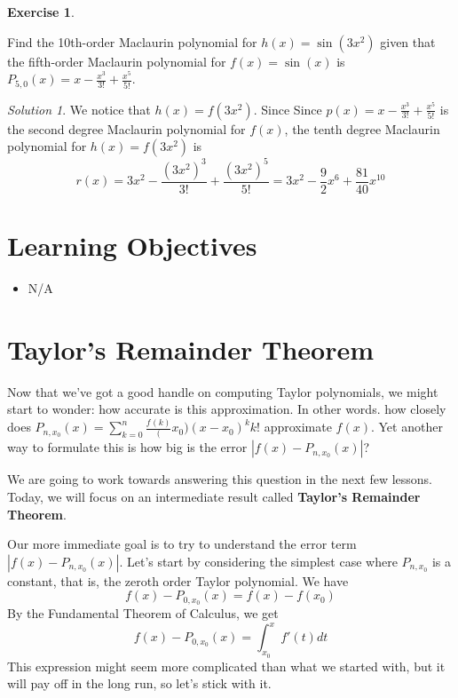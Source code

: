 \documentclass[
]{book}
\providecommand{\tightlist}{%
  \setlength{\itemsep}{0pt}\setlength{\parskip}{0pt}}
\theoremstyle{definition}
\theoremstyle{definition}
\theoremstyle{definition}
\newtheorem{exercise}{Exercise}[chapter]
\theoremstyle{definition}
\theoremstyle{remark}
\newtheorem*{solution}{Solution}
\begin{document}
\begin{exercise}
\protect\hypertarget{exr:unlabeled-div-159}{}\label{exr:unlabeled-div-159}

Find the 10th-order Maclaurin polynomial for \(h(x)=\sin(3x^2)\) given that the fifth-order Maclaurin polynomial for \(f(x)=\sin(x)\) is \(P_{5,0}(x)=x-\frac{x^3}{3!}+\frac{x^5}{5!}\).

\end{exercise}

\begin{solution}

We notice that \(h(x)=f(3x^2)\). Since Since \(p(x)=x-\frac{x^3}{3!}+\frac{x^5}{5!}\) is the second degree Maclaurin polynomial for \(f(x)\), the tenth degree Maclaurin polynomial for \(h(x)=f(3x^2)\) is \[r(x)=3x^2-\frac{(3x^2)^3}{3!}+\frac{(3x^2)^5}{5!}= 3x^2-\frac{9}{2}x^6+\frac{81}{40}x^{10}\]

\end{solution}

\hypertarget{learning-objectives-21}{%
\section{Learning Objectives}\label{learning-objectives-21}}

\begin{itemize}
\tightlist
\item
  N/A
\end{itemize}

\hypertarget{taylors-remainder-theorem}{%
\section{Taylor's Remainder Theorem}\label{taylors-remainder-theorem}}

Now that we've got a good handle on computing Taylor polynomials, we might start to wonder: how accurate is this approximation. In other words. how closely does \(P_{n, x_0}(x)=\sum_{k=0}^n \frac{f^{}(k)}(x_0)(x-x_0)^k{k!}\) approximate \(f(x)\). Yet another way to formulate this is how big is the error \(|f(x)-P_{n, x_0}(x)|\)?

We are going to work towards answering this question in the next few lessons. Today, we will focus on an intermediate result called \textbf{Taylor's Remainder Theorem}.

Our more immediate goal is to try to understand the error term \(|f(x)-P_{n, x_0}(x)|\). Let's start by considering the simplest case where \(P_{n, x_0}\) is a constant, that is, the zeroth order Taylor polynomial. We have \[f(x)-P_{0,x_0}(x)=f(x)-f(x_0)\]
By the Fundamental Theorem of Calculus, we get \[f(x)-P_{0,x_0}(x)=\int_{x_0}^x f'(t)dt\]
This expression might seem more complicated than what we started with, but it will pay off in the long run, so let's stick with it.
\end{document}
